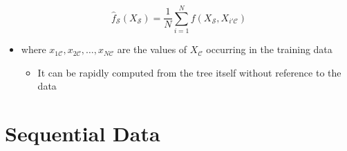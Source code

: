 \documentclass[11pt]{article}
\begin{document}
\begin{equation}
    \hat f_{\mathcal S} (X_\mathcal S) = \frac1N \sum_{i=1}^Nf(X_\mathcal S,X_{i'\mathcal C})
\end{equation}
\begin{itemize}
\item where \(x_{1\mathcal C}, x_{2\mathcal C}, \dots, x_{N\mathcal C}\) are the values of \(X_\mathcal C\) occurring in the training data
\begin{itemize}
\item It can be rapidly computed from the tree itself without reference to the data
\end{itemize}
\end{itemize}

\section{Sequential Data}
\label{sec:org9329022}
\end{document}
